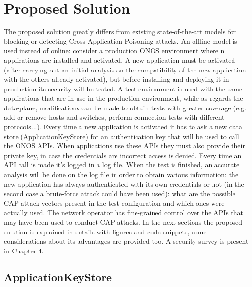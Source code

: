 \chapter{Proposed Solution}

The proposed solution greatly differs from existing state-of-the-art models for blocking or detecting Cross Application Poisoning attacks. An offline model is used instead of online: consider a production ONOS environment where n applications are installed and activated. A new application must be activated (after carrying out an initial analysis on the compatibility of the new application with the others already activated), but before installing and deploying it in production its security will be tested. A test environment is used with the same applications that are in use in the production environment, while as regards the data-plane, modifications can be made to obtain tests with greater coverage (e.g. add or remove hosts and switches, perform connection tests with different protocols...). Every time a new application is activated it has to ask a new data store (ApplicationKeyStore) for an authentication key that will be used to call the ONOS APIs. When applications use these APIs they must also provide their private key, in case the credentials are incorrect access is denied. Every time an API call is made it's logged in a log file. When the test is finished, an accurate analysis will be done on the log file in order to obtain various information: the new application has always authenticated with its own credentials or not (in the second case a brute-force attack could have been used); what are the possible CAP attack vectors present in the test configuration and which ones were actually used. The network operator has fine-grained control over the APIs that may have been used to conduct CAP attacks. In the next sections the proposed solution is explained in details with figures and code snippets, some considerations about its advantages are provided too. A security survey is present in Chapter 4.

\section{ApplicationKeyStore}

